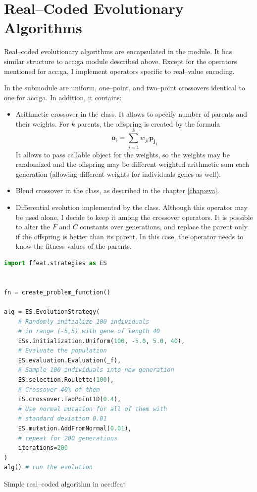 \section{Real--Coded Evolutionary Algorithms}

Real--coded evolutionary algorithms are encapsulated in the  module. It has similar structure to \acrshort{acc:ga} module described above. Except for the operators mentioned for \acrshort{acc:ga}, I implement operators specific to real--value encoding.

In the  submodule are uniform, one--point, and two--point crossovers identical to one for \acrshort{acc:ga}. In addition, it contains:
\begin{itemize}
    \item Arithmetic crossover in the  class. It allows to specify number of parents and their weights. For $k$ parents, the offspring is created by the formula 
    $$\mathbf{o}_i=\sum_{j=1}^k w_{ji}\mathbf{p_j}_i$$
    It allows to pass callable object for the weights, so the weights may be randomized and the offspring may be different weighted arithmetic sum each generation (allowing different weights for individuals genes as well).
    \item Blend crossover in the  class, as described in the chapter \ref{chap:eva}.
    \item Differential evolution implemented by the  class. Although this operator may be used alone, I decide to keep it among the crossover operators. It is possible to alter the $F$ and $C$ constants over generations, and replace the parent only if the offspring is better than its parent. In this case, the operator needs to know the fitness values of the parents.
\end{itemize}

\begin{algorithm}[b!]
\begin{lstlisting}[language=Python, xrightmargin=18pt]
import ffeat.strategies as ES


fn = create_problem_function()

alg = ES.EvolutionStrategy(
    # Randomly initialize 100 individuals 
    # in range (-5,5) with gene of length 40
    ESs.initialization.Uniform(100, -5.0, 5.0, 40),
    # Evaluate the population
    ES.evaluation.Evaluation(_f),
    # Sample 100 individuals into new generation
    ES.selection.Roulette(100),
    # Crossover 40% of them
    ES.crossover.TwoPoint1D(0.4),
    # Use normal mutation for all of them with 
    # standard deviation 0.01
    ES.mutation.AddFromNormal(0.01),
    # repeat for 200 generations
    iterations=200
)
alg() # run the evolution
\end{lstlisting}
\caption{Simple real--coded algorithm in \acrshort*{acc:ffeat}}
\label{alg:esffeat}
\end{algorithm}

